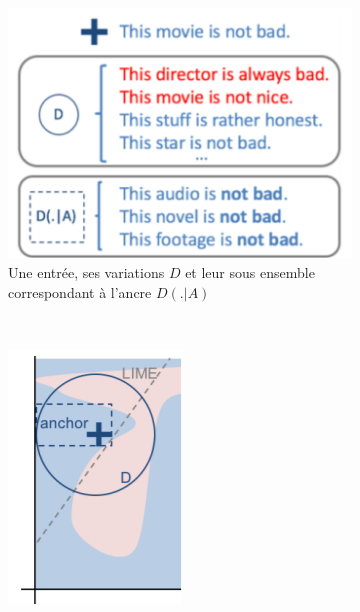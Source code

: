 \begin{figure}[htpb!]
    \centering
    \begin{subfigure}[b]{0.22\textwidth}
       \centering \includegraphics[width=\textwidth]{S1-Comment_evaluer_une_explication/figures/anchors_domain_1.png}
       \caption{Une entrée, ses variations $D$ et leur sous ensemble correspondant à l'ancre $D(.|A)$  }\label{fig:anchors_domain_1}
    \end{subfigure}
    ~
    \begin{subfigure}[b]{0.20\textwidth}
       \centering \includegraphics[width=\textwidth]{S1-Comment_evaluer_une_explication/figures/anchors_domain_2.png}

\end{subfigure}
\end{figure}
